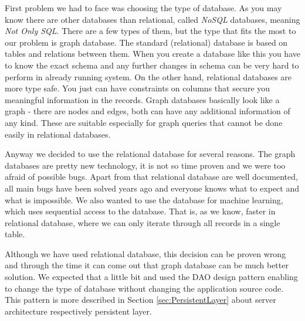 
First problem we had to face was choosing the type of database. As you may know
there are other databases than relational, called \emph{NoSQL} databases,
meaning \emph{Not Only SQL}. There are a few types of them, but the type that
fits the most to our problem is graph database. The standard (relational)
database is based on tables and relations between them. When you create a
database like this you have to know the exact schema and any further changes in
schema can be very hard to perform in already running system. On the other hand,
relational databases are more type safe. You just can have constraints on
columns that secure you meaningful information in the records. Graph databases
basically look like a graph - there are nodes and edges, both can have any
additional information of any kind. These are suitable especially for graph
queries that cannot be done easily in relational databases.

Anyway we decided to use the relational database for several reasons.
The graph databases are pretty new technology, it is not so time proven and we
were too afraid of  possible bugs. Apart from that relational database are well
documented, all main bugs have been solved years ago and everyone knows what to
expect and what is impossible.
We also wanted to use the database for machine learning, which uses sequential
access to the database. That is, as we know, faster in relational database,
where we can only iterate through all records in a single table.

Although we have used relational database, this decision can be proven wrong and
through the time it can come out that graph database can be much better
solution. We expected that a little bit and used the DAO design pattern enabling
to change the type of database without changing the application source code.
This pattern is more described in Section \ref{sec:PersistentLayer} about server
architecture respectively persistent layer.
